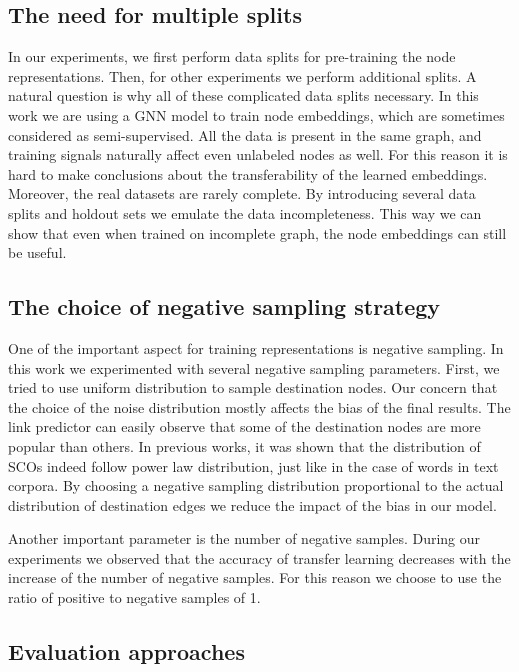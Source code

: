 \documentclass[a4paper,twoside]{article}
\begin{document}
\subsection{The need for multiple splits}

In our experiments, we first perform data splits for pre-training the node representations. Then, for other experiments we perform additional splits. 
A natural question is why all of these complicated data splits necessary. In this work we are using a GNN model to train node embeddings, which are sometimes considered as semi-supervised. All the data is present in the same graph, and training signals naturally affect even unlabeled nodes as well. For this reason it is hard to make conclusions about the transferability of the learned embeddings. Moreover, the real datasets are rarely complete. By introducing several data splits and holdout sets we emulate the data incompleteness. This way we can show that even when trained on incomplete graph, the node embeddings can still be useful.

\subsection{The choice of negative sampling strategy}

One of the important aspect for training representations is negative sampling. In this work we experimented with several negative sampling parameters. First, we tried to use uniform distribution to sample destination nodes. Our concern that the choice of the noise distribution mostly affects the bias of the final results. The link predictor can easily observe that some of the destination nodes are more popular than others. In previous works, it was shown that the distribution of SCOs indeed follow power law distribution, just like in the case of words in text corpora. By choosing a negative sampling distribution proportional to the actual distribution of destination edges we reduce the impact of the bias in our model. 

Another important parameter is the number of negative samples. During our experiments we observed that the accuracy of transfer learning decreases with the increase of the number of negative samples. For this reason we choose to use the ratio of positive to negative samples of 1.

\subsection{Evaluation approaches}
\end{document}
